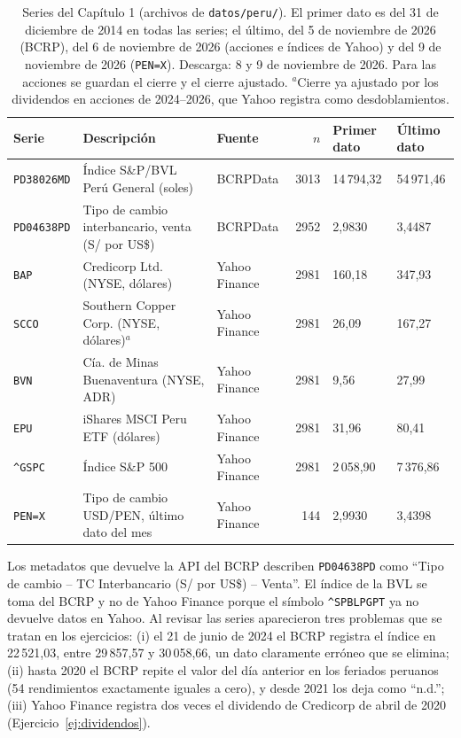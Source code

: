 \begin{table}[ht]
\centering\footnotesize
\begin{tabularx}{\linewidth}{@{}lXlrll@{}}
\toprule
Serie & Descripción & Fuente & $n$ & Primer dato & Último dato \\
\midrule
\texttt{PD38026MD} & Índice S\&P/BVL Perú General (soles) & BCRPData & 3013 & 14\,794,32 & 54\,971,46 \\
\texttt{PD04638PD} & Tipo de cambio interbancario, venta (S/ por US\$) & BCRPData & 2952 & 2,9830 & 3,4487 \\
\texttt{BAP} & Credicorp Ltd. (NYSE, dólares) & Yahoo Finance & 2981 & 160,18 & 347,93 \\
\texttt{SCCO} & Southern Copper Corp. (NYSE, dólares)$^{a}$ & Yahoo Finance & 2981 & 26,09 & 167,27 \\
\texttt{BVN} & Cía. de Minas Buenaventura (NYSE, ADR) & Yahoo Finance & 2981 & 9,56 & 27,99 \\
\texttt{EPU} & iShares MSCI Peru ETF (dólares) & Yahoo Finance & 2981 & 31,96 & 80,41 \\
\texttt{\^{}GSPC} & Índice S\&P 500 & Yahoo Finance & 2981 & 2\,058,90 & 7\,376,86 \\
\texttt{PEN=X} & Tipo de cambio USD/PEN, último dato del mes & Yahoo Finance & 144 & 2,9930 & 3,4398 \\
\bottomrule
\end{tabularx}
\caption{Series del Capítulo 1 (archivos de \texttt{datos/peru/}). El primer dato es del 31 de diciembre
de 2014 en todas las series; el último, del 5 de noviembre de 2026 (BCRP), del 6 de noviembre de 2026
(acciones e índices de Yahoo) y del 9 de noviembre de 2026 (\texttt{PEN=X}). Descarga: 8 y 9 de noviembre
de 2026. Para las acciones se guardan el cierre y el cierre ajustado. $^{a}$Cierre ya ajustado por los
dividendos en acciones de 2024--2026, que Yahoo registra como desdoblamientos.}
\label{tab:fuentes1}
\end{table}

Los metadatos que devuelve la API del BCRP describen \texttt{PD04638PD} como ``Tipo de cambio -- TC
Interbancario (S/ por US\$) -- Venta''. El índice de la BVL se toma del BCRP y no de Yahoo Finance porque
el símbolo \texttt{\^{}SPBLPGPT} ya no devuelve datos en Yahoo. Al revisar las series aparecieron tres
problemas que se tratan en los ejercicios: (i) el 21 de junio de 2024 el BCRP registra el índice en
22\,521,03, entre 29\,857,57 y 30\,058,66, un dato claramente erróneo que se elimina; (ii) hasta 2020 el
BCRP repite el valor del día anterior en los feriados peruanos (54 rendimientos exactamente iguales a cero),
y desde 2021 los deja como ``n.d.''; (iii) Yahoo Finance registra dos veces el dividendo de Credicorp de
abril de 2020 (Ejercicio~\ref{ej:dividendos}).


